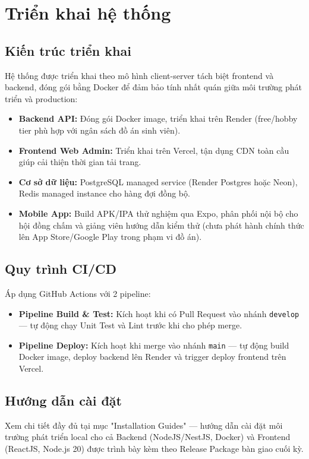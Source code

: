 \section{Triển khai hệ thống}

\subsection{Kiến trúc triển khai}
Hệ thống được triển khai theo mô hình client-server tách biệt frontend và
backend, đóng gói bằng Docker để đảm bảo tính nhất quán giữa môi trường
phát triển và production:

\begin{itemize}
    \item \textbf{Backend API:} Đóng gói Docker image, triển khai trên
    Render (free/hobby tier phù hợp với ngân sách đồ án sinh viên).
    \item \textbf{Frontend Web Admin:} Triển khai trên Vercel, tận dụng
    CDN toàn cầu giúp cải thiện thời gian tải trang.
    \item \textbf{Cơ sở dữ liệu:} PostgreSQL managed service (Render
    Postgres hoặc Neon), Redis managed instance cho hàng đợi đồng bộ.
    \item \textbf{Mobile App:} Build APK/IPA thử nghiệm qua Expo, phân
    phối nội bộ cho hội đồng chấm và giảng viên hướng dẫn kiểm thử (chưa
    phát hành chính thức lên App Store/Google Play trong phạm vi đồ án).
\end{itemize}

\subsection{Quy trình CI/CD}
Áp dụng GitHub Actions với 2 pipeline:
\begin{itemize}
    \item \textbf{Pipeline Build \& Test:} Kích hoạt khi có Pull Request
    vào nhánh \texttt{develop} — tự động chạy Unit Test và Lint trước
    khi cho phép merge.
    \item \textbf{Pipeline Deploy:} Kích hoạt khi merge vào nhánh
    \texttt{main} — tự động build Docker image, deploy backend lên
    Render và trigger deploy frontend trên Vercel.
\end{itemize}

\subsection{Hướng dẫn cài đặt}
Xem chi tiết đầy đủ tại mục "Installation Guides" — hướng dẫn cài đặt môi
trường phát triển local cho cả Backend (NodeJS/NestJS, Docker) và
Frontend (ReactJS, Node.js 20) được trình bày kèm theo Release Package
bàn giao cuối kỳ.